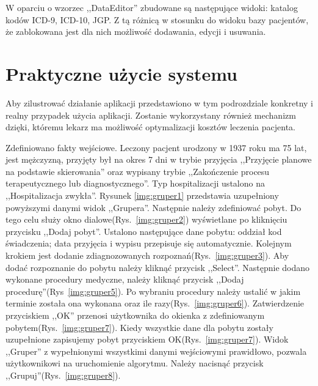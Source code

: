 W oparciu o wzorzec ,,DataEditor'' zbudowane są następujące widoki: katalog kodów \mbox{ICD-9}, \mbox{ICD-10}, JGP. Z tą różnicą w stosunku do widoku bazy pacjentów, że zablokowana jest dla nich możliwość dodawania, edycji i usuwania.


\section{Praktyczne użycie systemu}
\label{sec:praktyczneUzycieSystemu}
Aby zilustrować działanie aplikacji przedstawiono w tym podrozdziale konkretny i realny przypadek użycia aplikacji. Zostanie wykorzystany również mechanizm dzięki, któremu lekarz ma możliwość optymalizacji kosztów leczenia pacjenta.

Zdefiniowano fakty wejściowe. Leczony pacjent urodzony w 1937 roku ma 75 lat, jest mężczyzną, przyjęty był na okres 7 dni w trybie przyjęcia ,,Przyjęcie planowe na podstawie skierowania'' oraz wypisany trybie ,,Zakończenie procesu terapeutycznego lub diagnostycznego''. Typ hospitalizacji ustalono na ,,Hospitalizacja zwykła''. Rysunek \ref{img:gruper1} przedstawia uzupełniony powyższymi danymi widok ,,Grupera''. 
Następnie należy zdefiniować pobyt. Do tego celu służy okno dialowe(Rys.~\ref{img:gruper2}) wyświetlane po kliknięciu przycisku ,,Dodaj pobyt''. Ustalono następujące dane pobytu: oddział kod świadczenia; data przyjęcia i wypisu przepisuje się automatycznie.
Kolejnym krokiem jest dodanie zdiagnozowanych rozpoznań(Rys.~\ref{img:gruper3}). Aby dodać rozpoznanie do pobytu należy kliknąć przycisk ,,Select''.
Następnie dodano wykonane procedury medyczne, należy kliknąć przycisk ,,Dodaj procedurę''(Rys~\ref{img:gruper5}).
Po wybraniu procedury należy ustalić w jakim terminie została ona wykonana oraz ile razy(Rys.~\ref{img:gruper6}).
Zatwierdzenie przyciskiem ,,OK'' przenosi użytkownika do okienka z zdefiniowanym pobytem(Rys.~\ref{img:gruper7}).
Kiedy wszystkie dane dla pobytu zostały uzupełnione zapisujemy pobyt przyciskiem OK(Rys.~\ref{img:gruper7}).
Widok ,,Gruper'' z wypełnionymi wszystkimi danymi wejściowymi prawidłowo, pozwala użytkownikowi na uruchomienie algorytmu. Należy nacisnąć przycisk ,,Grupuj''(Rys.~\ref{img:gruper8}).

